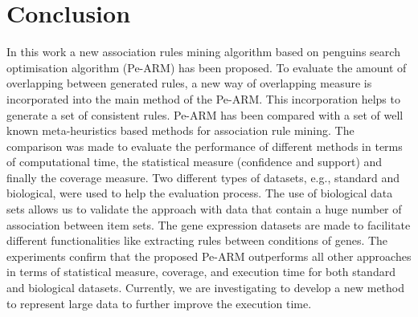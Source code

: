 \documentclass[preprint,12pt]{elsarticle}
\begin{document}

 \section{Conclusion}
In this work a new association rules mining algorithm based on penguins search optimisation 
algorithm (Pe-ARM) has been proposed. To evaluate the amount of overlapping between generated rules, a new way of overlapping measure is incorporated into the main method of the Pe-ARM.  This incorporation helps to generate a set of consistent rules. 
Pe-ARM has been compared with a set of well known meta-heuristics based methods for association rule mining. The comparison was made to evaluate the performance of different methods in terms of computational time, the statistical measure (confidence and support) and finally the coverage measure. Two different types of datasets, e.g., standard and biological, were used to help the evaluation process. The use of biological data sets allows us to validate the approach with data that contain a huge number of association between item sets. The gene expression datasets are made to facilitate different functionalities like extracting rules between conditions of genes. The experiments confirm that the proposed Pe-ARM outperforms all other approaches in terms of statistical measure, coverage, and execution time for both standard and biological datasets. 
Currently, we are investigating to develop a new method to represent large data to further improve the execution time.
\end{document}

